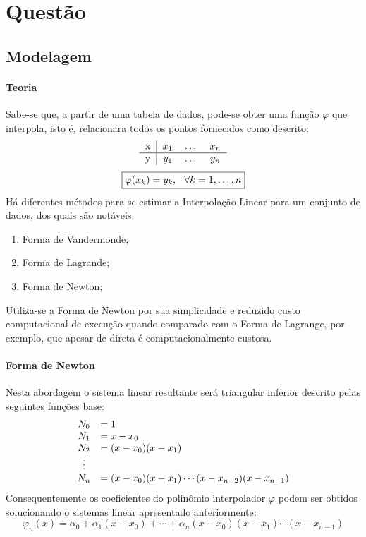 \documentclass{article}
\begin{document}
\section{Questão}
    \subsection{Modelagem}
        \paragraph{Teoria}Sabe-se que, a partir de uma tabela de dados, pode-se obter uma função $\varphi$ que interpola, isto é, relacionara todos os pontos fornecidos como descrito:
            \[
                \begin{tabular}{c | c c c}
                    x & $x_{1}$ & \dots & $x_{n}$\\ \hline
                    y & $y_{1}$ & \dots & $y_{n}$
                \end{tabular}
            \]
            \begin{equation}
                \boxed{\varphi(x_{k}) = y_{k}, \hspace{2.5mm} \forall k = 1, \dots, n}
            \end{equation}
        Há diferentes métodos para se estimar a Interpolação Linear para um conjunto de dados, dos quais são notáveis:
            \begin{enumerate}[noitemsep]
                \item Forma de Vandermonde;
                \item Forma de Lagrande;
                \item Forma de Newton;
            \end{enumerate}
        Utiliza-se a Forma de Newton por sua simplicidade e reduzido custo computacional de execução quando comparado com o Forma de Lagrange, por exemplo, que apesar de direta é computacionalmente custosa.

        \paragraph{Forma de Newton}Nesta abordagem o sistema linear resultante será triangular inferior descrito pelas seguintes funções base:
            \[
                \begin{array}{c l}
                    N_{0} & = 1\\
                    N_{1} & = x - x_{0}\\
                    N_{2} & = (x - x_{0})(x - x_{1})\\
                    \vdots&\\
                    N_{n} & = (x - x_{0})(x - x_{1})\cdots(x - x_{n-2})(x - x_{n-1})\\
                \end{array}
            \]
        Consequentemente os coeficientes do polinômio interpolador $\varphi$ podem ser obtidos solucionando o sistemas linear apresentado anteriormente:
            \[\boxed{\varphi_{n}(x) = \alpha_{0} + \alpha_{1}(x - x_{0}) + \cdots + \alpha_{n}(x - x_{0})(x - x_{1})\cdots(x -x_{n-1})}\]
\end{document}
